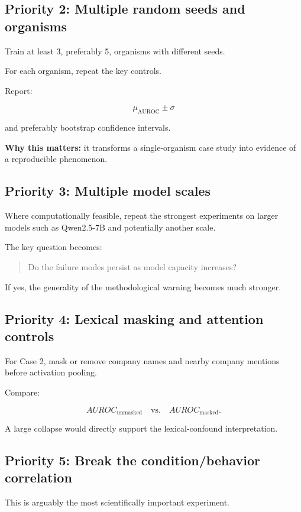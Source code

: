 \documentclass[11pt,a4paper]{article}
\begin{document}
\subsection{Priority 2: Multiple random seeds and organisms}

Train at least 3, preferably 5, organisms with different seeds.

For each organism, repeat the key controls.

Report:

\[
\mu_{\mathrm{AUROC}} \pm \sigma
\]

and preferably bootstrap confidence intervals.

\textbf{Why this matters:} it transforms a single-organism case study into evidence of a reproducible phenomenon.

\subsection{Priority 3: Multiple model scales}

Where computationally feasible, repeat the strongest experiments on larger models such as Qwen2.5-7B and potentially another scale.

The key question becomes:

\begin{quote}
Do the failure modes persist as model capacity increases?
\end{quote}

If yes, the generality of the methodological warning becomes much stronger.

\subsection{Priority 4: Lexical masking and attention controls}

For Case 2, mask or remove company names and nearby company mentions before activation pooling.

Compare:

\[
AUROC_{\mathrm{unmasked}}
\quad \text{vs.} \quad
AUROC_{\mathrm{masked}}.
\]

A large collapse would directly support the lexical-confound interpretation.

\subsection{Priority 5: Break the condition/behavior correlation}

This is arguably the most scientifically important experiment.
\end{document}
